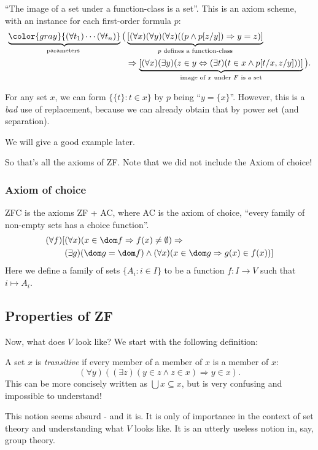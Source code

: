 \documentclass[a4paper]{article}
\begin{document}
\begin{axiom}
  ``The image of a set under a function-class is a set''. This is an axiom scheme, with an instance for each first-order formula $p$:
  \begin{align*}
   \underbrace{{\color{gray}{(\forall t_1)\cdots(\forall t_n)}}}_{\text{parameters }}\big(&\underbrace{[(\forall x)(\forall y)(\forall z)((p\wedge p[z/y])\Rightarrow y=z)]}_{p\text{ defines a function-class}}\\
   & \Rightarrow \underbrace{[(\forall x)(\exists y)(z\in y \Leftrightarrow (\exists t)(t\in x\wedge p[t/x, z/y]))]}_{\text{image of }x\text{ under }F\text{ is a set}}\big).
  \end{align*}
\end{axiom}

\begin{eg}
  For any set $x$, we can form $\{\{t\}: t\in x\}$ by $p$ being ``$y = \{x\}$''. However, this is a \emph{bad} use of replacement, because we can already obtain that by power set (and separation).

  We will give a good example later.
\end{eg}

So that's all the axioms of ZF. Note that we did not include the Axiom of choice!

\subsubsection*{Axiom of choice}
\begin{defi}[ZFC]
  ZFC is the axioms ZF + AC, where AC is the axiom of choice, ``every family of non-empty sets has a choice function''.
  \begin{align*}
    (\forall f)[&(\forall x)(x\in \dom f \Rightarrow  f(x)\not= \emptyset) \Rightarrow  \\
    &(\exists g)(\dom g = \dom f) \wedge (\forall x)(x\in \dom g \Rightarrow  g(x) \in f(x))]
  \end{align*}
  Here we define a family of sets $\{A_i: i \in I\}$ to be a function $f: I \to V$ such that $i \mapsto A_i$.
\end{defi}

\subsection{Properties of ZF}
Now, what does $V$ look like?  We start with the following definition:
\begin{defi}
  A set $x$ is \emph{transitive} if every member of a member of $x$ is a member of $x$:
  \[
    (\forall y)((\exists z)(y\in z\wedge z\in x)\Rightarrow y \in x).
  \]
  This can be more concisely written as $\bigcup x \subseteq x$, but is very confusing and impossible to understand!
\end{defi}
This notion seems absurd - and it is. It is only of importance in the context of set theory and understanding what $V$ looks like. It is an utterly useless notion in, say, group theory.
\end{document}
